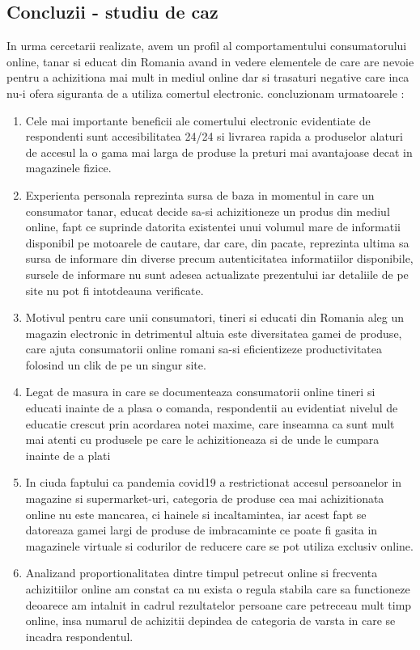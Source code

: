 \documentclass[a4paper, 12pt]{article}
\begin{document}
	\subsection{Concluzii - studiu de caz}
	\qquad In urma cercetarii realizate, avem un profil al comportamentului consumatorului online, tanar si educat din Romania avand in vedere elementele de care are nevoie pentru a achizitiona mai mult in mediul online dar si trasaturi negative care inca nu-i ofera siguranta de a utiliza comertul electronic.
	concluzionam urmatoarele :
	\begin{enumerate}[1.]
	\item Cele mai importante beneficii ale comertului electronic evidentiate de respondenti sunt accesibilitatea 24/24 si livrarea rapida a produselor alaturi de accesul la o gama mai larga de produse la preturi mai avantajoase decat in magazinele fizice.
	\item Experienta personala reprezinta sursa de baza in momentul in care un consumator tanar, educat decide sa-si achizitioneze un produs din mediul online, fapt ce suprinde datorita existentei unui volumul mare de informatii disponibil pe motoarele de cautare, dar care, din pacate, reprezinta ultima sa sursa de informare din diverse precum autenticitatea informatiilor disponibile, sursele de informare nu sunt adesea actualizate prezentului iar detaliile de pe site nu pot fi intotdeauna verificate.
	\item Motivul pentru care unii consumatori, tineri si educati din Romania aleg un magazin electronic in detrimentul altuia este diversitatea gamei de produse, care ajuta consumatorii online romani sa-si eficientizeze productivitatea folosind un clik de pe un singur site.
	\item Legat de masura in care se documenteaza consumatorii online tineri si educati inainte de a plasa o comanda, respondentii au evidentiat nivelul de educatie crescut prin acordarea notei maxime, care inseamna ca sunt mult mai atenti cu produsele pe care le achizitioneaza si de unde le cumpara inainte de a plati
	\item In ciuda faptului ca pandemia covid19 a restrictionat accesul persoanelor in magazine si supermarket-uri, categoria de produse cea mai achizitionata online nu este mancarea, ci hainele si incaltamintea, iar acest fapt se datoreaza gamei largi de produse de imbracaminte ce poate fi gasita in magazinele virtuale si codurilor de reducere care se pot utiliza exclusiv online.
	\item Analizand proportionalitatea dintre timpul petrecut online si frecventa achizitiilor online am constat ca nu exista o regula stabila care sa functioneze deoarece am intalnit in cadrul rezultatelor persoane care petreceau mult timp online, insa numarul de achizitii depindea de categoria de varsta in care se incadra respondentul.

\end{enumerate}
\end{document}
